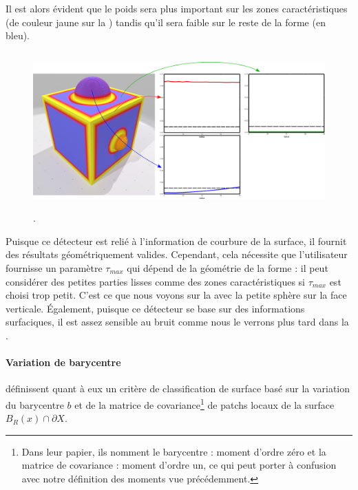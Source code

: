 Il est alors évident que le poids sera plus important sur les zones
caractéristiques (de couleur jaune sur la )
tandis qu'il sera faible sur le reste de la forme (en bleu).

\begin{figure}[ht]{
  \begin{center}
    \includegraphics[height=6cm]{figures/CubeSpherePlotPauly}
  \end{center}}
    \caption[.]{.
    \label{fig:pauly-cubesphere}}
\end{figure}

Puisque ce détecteur est relié à l'information de courbure de la surface, il
fournit des résultats géométriquement valides. Cependant, cela nécessite que
l'utilisateur fournisse un paramètre $\tau_{max}$ qui dépend de la
géométrie de la forme : il peut considérer des petites parties lisses comme des
zones caractéristiques si $\tau_{max}$ est choisi trop petit. C'est ce que nous
voyons sur la  avec la petite sphère sur la face
verticale. Également, puisque ce détecteur se base sur des informations
surfaciques, il est assez sensible au bruit comme nous le verrons plus tard dans
la .

\paragraph{Variation de barycentre}

 définissent quant à eux un critère de
classification de surface basé sur la variation du barycentre $b$ et de la
matrice de covariance\footnote{Dans leur papier, ils nomment le barycentre :
moment d'ordre zéro et la matrice de covariance : moment d'ordre un, ce qui peut
porter à confusion avec notre définition des moments vue précédemment.} de
patchs locaux de la surface $B_R(x)\cap \partial X$.

